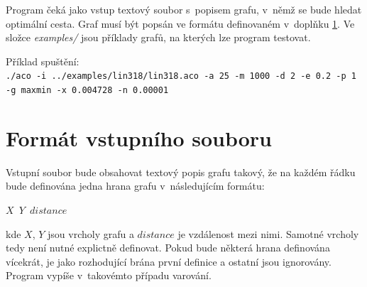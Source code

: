 \documentclass[a4paper, 12pt]{article}
\begin{document}
Program čeká jako vstup textový soubor s~popisem grafu, v~němž se bude hledat optimální cesta. Graf musí být popsán ve formátu definovaném 
v~doplňku \ref{app:format}. Ve složce \emph{examples/} jsou příklady grafů, na kterých lze program testovat.

Příklad spuštění:\\
\texttt{./aco -i ../examples/lin318/lin318.aco -a 25 -m 1000 -d 2 -e 0.2 -p 1\\-g maxmin -x 0.004728 -n 0.00001}

\section{Formát vstupního souboru}
\label{app:format}
Vstupní soubor bude obsahovat textový popis grafu takový, že na každém řádku bude definována jedna hrana grafu v~následujícím formátu:
\begin{center}
  \texttt{$X$ $Y$ $distance$}
\end{center}
kde $X$, $Y$ jsou vrcholy grafu a $distance$ je vzdálenost mezi nimi. Samotné vrcholy tedy není nutné explictně definovat. Pokud bude některá hrana
definována vícekrát, je jako rozhodující brána první definice a ostatní jsou ignorovány. Program vypíše v~takovémto případu varování.

\newpage


\end{document}

